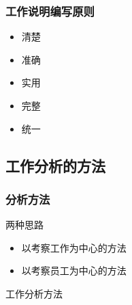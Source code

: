 \documentclass{ctexart}
\begin{document}
\subsubsection{工作说明编写原则}
\label{sec-1-2-3}
\begin{itemize}
\item 清楚
\item 准确
\item 实用
\item 完整
\item 统一
\end{itemize}
\subsection{工作分析的方法}
\label{sec-1-3}
\subsubsection{分析方法}
\label{sec-1-3-1}
两种思路
\begin{itemize}
\item 以考察工作为中心的方法
\item 以考察员工为中心的方法
\end{itemize}
工作分析方法
\end{document}
